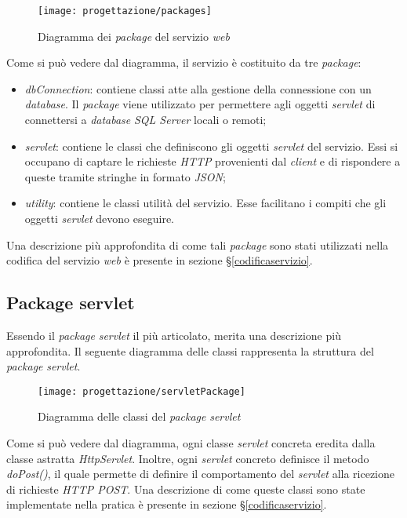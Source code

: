 \begin{figure}[!h] 
    \centering 
    \texttt{[image: progettazione/packages]} 
    \caption{Diagramma dei \textit{package} del servizio \textit{web}}
\end{figure}

Come si può vedere dal diagramma, il servizio è costituito da tre \textit{package}:
\begin{itemize}
	\item \textit{dbConnection}: contiene classi atte alla gestione della connessione con un \textit{database}. Il \textit{package} viene utilizzato per permettere agli oggetti \textit{servlet} di connettersi a \textit{database} \textit{SQL Server} locali o remoti;
	\item \textit{servlet}: contiene le classi che definiscono gli oggetti \textit{servlet} del servizio. Essi si occupano di captare le richieste \textit{HTTP} provenienti dal \textit{client} e di rispondere a queste tramite stringhe in formato \textit{JSON};
	\item \textit{utility}: contiene le classi utilità del servizio. Esse facilitano i compiti che gli oggetti \textit{servlet} devono eseguire.
\end{itemize}
Una descrizione più approfondita di come tali \textit{package} sono stati utilizzati nella codifica del servizio \textit{web} è presente in sezione §\ref{codificaservizio}.

\subsection{Package servlet}

Essendo il \textit{package} \textit{servlet} il più articolato, merita una descrizione più approfondita. Il seguente diagramma delle classi rappresenta la struttura del \textit{package} \textit{servlet}.

\begin{figure}[!h] 
    \centering 
    \texttt{[image: progettazione/servletPackage]} 
    \caption{Diagramma delle classi del \textit{package} \textit{servlet}}
\end{figure}

Come si può vedere dal diagramma, ogni classe \textit{servlet} concreta eredita dalla classe astratta \textit{HttpServlet}. Inoltre, ogni \textit{servlet} concreto definisce il metodo \textit{doPost()}, il quale permette di definire il comportamento del \textit{servlet} alla ricezione di richieste \textit{HTTP POST}. Una descrizione di come queste classi sono state implementate nella pratica è presente in sezione §\ref{codificaservizio}.

